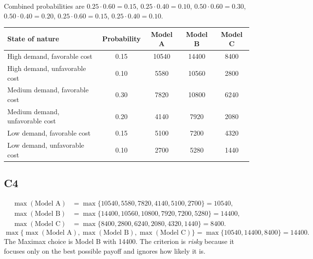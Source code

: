 \begin{ExamProblems}
\begin{center}
		\end{center}
		Combined probabilities are $0.25=0.15$, $0.25=0.10$, $0.50=0.30$, $0.50=0.20$, $0.25=0.15$, $0.25=0.10$.
		\begin{center}
			\begin{tabular}{l c c c c}
				\toprule
				State of nature & Probability & Model A & Model B & Model C \\
				\midrule
				High demand, favorable cost & 0.15 & 10540 & 14400 & 8400 \\
				High demand, unfavorable cost & 0.10 & 5580 & 10560 & 2800 \\
				Medium demand, favorable cost & 0.30 & 7820 & 10800 & 6240 \\
				Medium demand, unfavorable cost & 0.20 & 4140 & 7920 & 2080 \\
				Low demand, favorable cost & 0.15 & 5100 & 7200 & 4320 \\
				Low demand, unfavorable cost & 0.10 & 2700 & 5280 & 1440 \\
				\bottomrule
			\end{tabular}
		\end{center}

		\subsection*{C4}
		\[
		\begin{aligned}
		\max(\text{Model A}) &= \max\{10540,5580,7820,4140,5100,2700\} = 10540,\\
		\max(\text{Model B}) &= \max\{14400,10560,10800,7920,7200,5280\} = 14400,\\
		\max(\text{Model C}) &= \max\{8400,2800,6240,2080,4320,1440\} = 8400.
		\end{aligned}
		\]
		\[
		\max\{\max(\text{Model A}), \max(\text{Model B}), \max(\text{Model C})\}
		= \max\{10540, 14400, 8400\}
		= 14400.
		\]
		The Maximax choice is Model B with 14400. The criterion is \emph{risky} because it focuses only on the best possible payoff and ignores how likely it is.


\end{ExamProblems}
